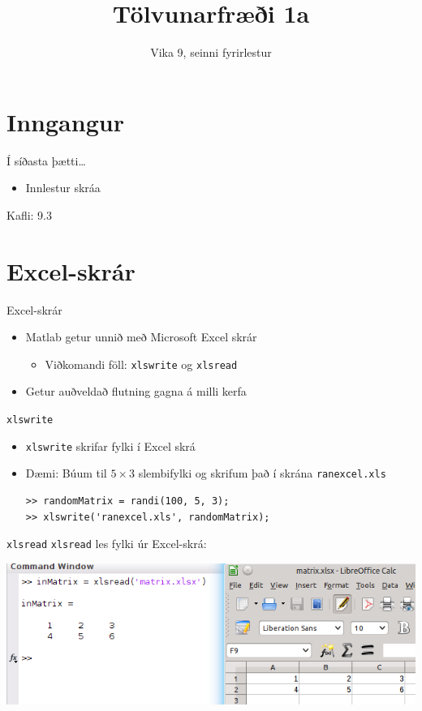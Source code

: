 \documentclass{beamer}
\title{Tölvunarfræði 1a}
\subtitle{Vika 9, seinni fyrirlestur}
\begin{document}
\begin{frame}
\titlepage
\end{frame}

\section{Inngangur}

\begin{frame}{Í síðasta þætti\ldots}
\begin{itemize}
 \item Innlestur skráa
\end{itemize}
Kafli: 9.3
\end{frame}

\section{Excel-skrár}

\begin{frame}{Excel-skrár}
\begin{itemize}
 \item Matlab getur unnið með Microsoft Excel skrár
 \begin{itemize}
  \item Viðkomandi föll: \texttt{xlswrite} og \texttt{xlsread}
 \end{itemize}
 \item Getur auðveldað flutning gagna á milli kerfa
\end{itemize}
\end{frame}

\begin{frame}[fragile]{\texttt{xlswrite}}
\begin{itemize}
 \item \texttt{xlswrite} skrifar fylki í Excel skrá
 \item Dæmi: Búum til $5 \times 3$ slembifylki og skrifum það í skrána \texttt{ranexcel.xls}
\begin{verbatim}
>> randomMatrix = randi(100, 5, 3); 
>> xlswrite('ranexcel.xls', randomMatrix); 
\end{verbatim}
\end{itemize}
\end{frame}

\begin{frame}[fragile]{\texttt{xlsread}}
\texttt{xlsread} les fylki úr Excel-skrá:

\includegraphics[width=\textwidth]{Pics/excel}

\end{frame}
\end{document}
